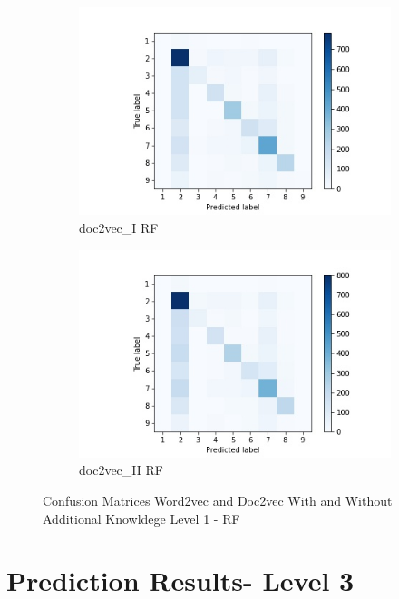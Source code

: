 \documentclass[12pt, a4paper, titlepage]{article}
\begin{document}
\begin{figure}[hb!]
\begin{subfigure}[b]{0.475\textwidth}
    \centering 
    \includegraphics[width=\textwidth]{cm_doc2vec_without_RF.jpg}
    {{\small doc2vec\_I RF}}    
  \end{subfigure}
  \hfill
  \begin{subfigure}[b]{0.475\textwidth}   
      \centering 
      \includegraphics[width=\textwidth]{cm_doc2vec_with_RF.jpg}
      {{\small doc2vec\_II RF}}    
  \end{subfigure}
  \caption{\label{fig: F24} Confusion Matrices Word2vec and Doc2vec With and Without Additional Knowldege Level 1 - RF}
\end{figure}

\newpage
\section{Prediction Results- Level 3}
\label{sec:C}
\end{document}
